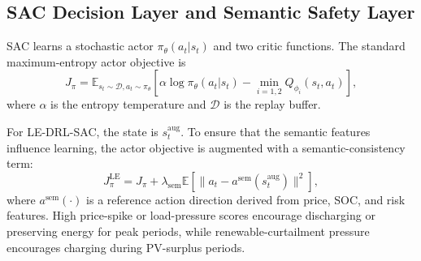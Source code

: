 \documentclass{ieeeaccess}
\begin{document}
\subsection{SAC Decision Layer and Semantic Safety Layer}
SAC learns a stochastic actor $\pi_\theta(a_t|s_t)$ and two critic functions. The standard maximum-entropy actor objective is
\begin{equation}
J_{\pi} =
\mathbb{E}_{s_t \sim \mathcal{D}, a_t \sim \pi_\theta}
\left[
\alpha \log \pi_\theta(a_t|s_t)
- \min_{i=1,2} Q_{\phi_i}(s_t,a_t)
\right],
\end{equation}
where $\alpha$ is the entropy temperature and $\mathcal{D}$ is the replay buffer.

For LE-DRL-SAC, the state is $s^{\mathrm{aug}}_t$. To ensure that the semantic features influence learning, the actor objective is augmented with a semantic-consistency term:
\begin{equation}
J_{\pi}^{\mathrm{LE}} =
J_{\pi}
+ \lambda_{\mathrm{sem}}
\mathbb{E}\left[
\| a_t - a^{\mathrm{sem}}(s^{\mathrm{aug}}_t) \|^2
\right],
\end{equation}
where $a^{\mathrm{sem}}(\cdot)$ is a reference action direction derived from price, SOC, and risk features. High price-spike or load-pressure scores encourage discharging or preserving energy for peak periods, while renewable-curtailment pressure encourages charging during PV-surplus periods.
\end{document}
